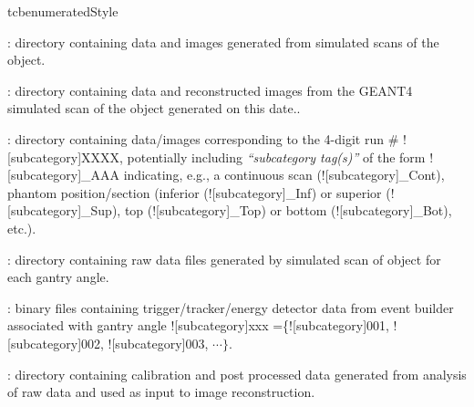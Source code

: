 \begin{tcbenvironment}
\begin{tcbparbox}{tcbenumeratedStyle}
\begin{ThinEnum}
\begin{ThinEnum}
\begin{ThinEnum}
\begin{ThinEnum}
\begin{ThinEnum}
\begin{ThinEnum}
\begin{ThinEnum}
\begin{ThinEnum}
\begin{ThinEnum}
\begin{ThinEnum}
                                        \end{ThinEnum}
                                    \end{ThinEnum}
                                \end{ThinEnum}
                            \end{ThinEnum}
                        \end{ThinEnum}
                    \end{ThinEnum}
                \end{ThinEnum}
            \end{ThinEnum}
            \item {} : directory containing data and images generated from simulated scans of the object.
            \begin{ThinEnum}
                \item {} : directory containing data and reconstructed images from the GEANT4 simulated scan of the object generated on this date..
                \begin{ThinEnum}
                    \item {} : directory containing data/images corresponding to the 4-digit run \# \docentry![subcategory]{XXXX}, potentially including \emph{``subcategory tag(s)''} of the form \docentry![subcategory]{\_AAA} indicating, e.g., a continuous scan (\docentry![subcategory]{\_Cont}), phantom position/section (inferior (\docentry![subcategory]{\_Inf}) or superior (\docentry![subcategory]{\_Sup}), top (\docentry![subcategory]{\_Top}) or bottom (\docentry![subcategory]{\_Bot}), etc.).
                    \begin{ThinEnum}
                        \item {} : directory containing raw data files generated by simulated scan of object for each gantry angle.
                        \begin{ThinEnum}
                            \item {} : binary files containing trigger/tracker/energy detector data from event builder associated with gantry angle \docentry![subcategory]{xxx} =\{\docentry![subcategory]{001}, \docentry![subcategory]{002}, \docentry![subcategory]{003}, $\cdots\}$.
                        \end{ThinEnum}
                        \item {} : directory containing calibration and post processed data generated from analysis of raw data and used as input to image reconstruction.

\end{ThinEnum}
\end{ThinEnum}
\end{ThinEnum}
\end{ThinEnum}
\end{ThinEnum}
\end{tcbparbox}
\end{tcbenvironment}
